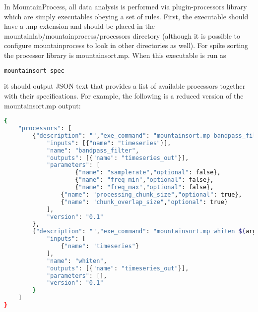 \documentclass{article}
\begin{document}
In MountainProcess, all data analysis is performed via plugin-processors library which are simply executables obeying a set of rules. First, the executable should have a .mp extension and should be placed in the mountainlab/mountainprocess/processors directory (although it is possible to configure mountainprocess to look in other directories as well). For spike sorting the processor library is mountainsort.mp. When this executable is run as
\begin{lstlisting}[language=bash]
mountainsort spec
\end{lstlisting}
it should output JSON text that provides a list of available processors together with their specifications. For example, the following is a reduced version of the mountainsort.mp output:
\begin{lstlisting}[language=bash]
{
    "processors": [
        {"description": "","exe_command": "mountainsort.mp bandpass_filter $(arguments)",
            "inputs": [{"name": "timeseries"}],
            "name": "bandpass_filter",
            "outputs": [{"name": "timeseries_out"}],
            "parameters": [
                    {"name": "samplerate","optional": false},
                    {"name": "freq_min","optional": false},
                    {"name": "freq_max","optional": false},
                {"name": "processing_chunk_size","optional": true},
                {"name": "chunk_overlap_size","optional": true}
            ],
            "version": "0.1"
        },
        {"description": "","exe_command": "mountainsort.mp whiten $(arguments)",
            "inputs": [
                {"name": "timeseries"}
            ],
            "name": "whiten",
            "outputs": [{"name": "timeseries_out"}],
            "parameters": [],
            "version": "0.1"
        }
    ]
}
\end{lstlisting}
\end{document}
